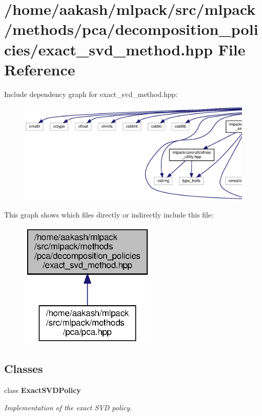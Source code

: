 \section{/home/aakash/mlpack/src/mlpack/methods/pca/decomposition\+\_\+policies/exact\+\_\+svd\+\_\+method.hpp File Reference}
\label{exact__svd__method_8hpp}
Include dependency graph for exact\+\_\+svd\+\_\+method.\+hpp\+:
\nopagebreak
\begin{figure}[H]
\begin{center}
\leavevmode
\includegraphics[width=350pt]{exact__svd__method_8hpp__incl}
\end{center}
\end{figure}
This graph shows which files directly or indirectly include this file\+:
\nopagebreak
\begin{figure}[H]
\begin{center}
\leavevmode
\includegraphics[width=184pt]{exact__svd__method_8hpp__dep__incl}
\end{center}
\end{figure}
\subsection*{Classes}
\begin{DoxyCompactItemize}
\item 
class \textbf{ Exact\+S\+V\+D\+Policy}
\begin{DoxyCompactList}\small\item\em Implementation of the exact S\+VD policy. \end{DoxyCompactList}\end{DoxyCompactItemize}
